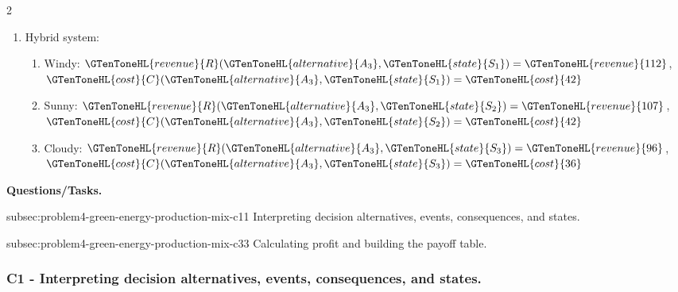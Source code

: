 \begin{multicols}{2}
\begin{enumerate}[label=\arabic*.]
\begin{enumerate}[label=\roman*)]
			\item Sunny:
			\(\GTenToneHL{revenue}{R}(\GTenToneHL{alternative}{A_2},\GTenToneHL{state}{S_2})=\GTenToneHL{revenue}{143}\), \(\GTenToneHL{cost}{C}(\GTenToneHL{alternative}{A_2},\GTenToneHL{state}{S_2})=\GTenToneHL{cost}{48}\)
			
			\item Cloudy:
			\(\GTenToneHL{revenue}{R}(\GTenToneHL{alternative}{A_2},\GTenToneHL{state}{S_3})=\GTenToneHL{revenue}{63}\), \(\GTenToneHL{cost}{C}(\GTenToneHL{alternative}{A_2},\GTenToneHL{state}{S_3})=\GTenToneHL{cost}{38}\)
		\end{enumerate}
		
		\item Hybrid system:
		\begin{enumerate}[label=\roman*)]
			\item Windy:
			\(\GTenToneHL{revenue}{R}(\GTenToneHL{alternative}{A_3},\GTenToneHL{state}{S_1})=\GTenToneHL{revenue}{112}\), \(\GTenToneHL{cost}{C}(\GTenToneHL{alternative}{A_3},\GTenToneHL{state}{S_1})=\GTenToneHL{cost}{42}\)
			
			\item Sunny:
			\(\GTenToneHL{revenue}{R}(\GTenToneHL{alternative}{A_3},\GTenToneHL{state}{S_2})=\GTenToneHL{revenue}{107}\), \(\GTenToneHL{cost}{C}(\GTenToneHL{alternative}{A_3},\GTenToneHL{state}{S_2})=\GTenToneHL{cost}{42}\)
			
			\item Cloudy:
			\(\GTenToneHL{revenue}{R}(\GTenToneHL{alternative}{A_3},\GTenToneHL{state}{S_3})=\GTenToneHL{revenue}{96}\), \(\GTenToneHL{cost}{C}(\GTenToneHL{alternative}{A_3},\GTenToneHL{state}{S_3})=\GTenToneHL{cost}{36}\)
		\end{enumerate}
	\end{enumerate}
\end{multicols}

\textbf{Questions/Tasks.}
\begin{enumerate}
	\CriterionTask
	{subsec:problem4-green-energy-production-mix-c1}{1}
	{Interpreting decision alternatives, events, consequences, and states.}

	\CriterionTask
	{subsec:problem4-green-energy-production-mix-c3}{3}
	{Calculating profit and building the payoff table.}
\end{enumerate}

\subsubsection*{C1 - Interpreting decision alternatives, events, consequences, and states.}
\label{subsec:problem4-green-energy-production-mix-c1}

